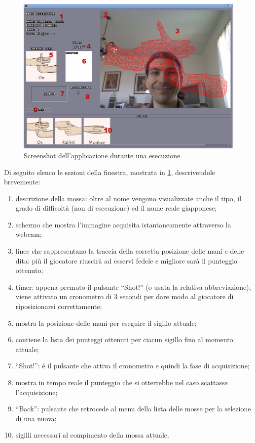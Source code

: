\documentclass[a4paper,10pt, twocolumn]{article}
\begin{document}
  \begin{figure}
    \caption{Screenshot dell'applicazione durante una esecuzione}
    \label{screenshot}       
    \includegraphics[scale=0.25]{screenShot}
  \end{figure}
  
  Di seguito elenco le sezioni della finestra, mostrata in \ref{screenshot},
  descrivendole brevemente:
  \begin{enumerate}
   \item descrizione della mossa: oltre al nome vengono visualizzate anche il tipo,
	 il grado di difficolt\`{a} (non di esecuzione) ed il nome reale giapponese;
   \item schermo che mostra l'immagine acquisita istantaneamente attraverso la webcam;
   \item linee che rappresentano la traccia della corretta posizione delle mani e delle dita:
	 pi\`{u} il
	 giocatore riuscir\`{a} ad esservi fedele e migliore sar\`{a} il punteggio ottenuto;
   \item timer: appena premuto il pulsante ``Shot!'' (o usata la relativa abbreviazione),
	 viene attivato un cronometro di 3 secondi per dare modo al giocatore di 
	 riposizionarsi correttamente;
   \item mostra la posizione delle mani per eseguire il sigillo attuale;
   \item contiene la lista dei punteggi ottenuti per ciacun sigillo fino al momento attuale;
   \item ``Shot!'': \`{e} il pulsante che attiva il cronometro e quindi la fase di acquisizione;
   \item mostra in tempo reale il punteggio che si otterrebbe nel caso scattasse l'acquisizione;
   \item ``Back'': pulsante che retrocede al menu della lista delle mosse per la selezione di una
	 nuova;
   \item sigilli necessari al compimento della mossa attuale.
  \end{enumerate}
\end{document}
